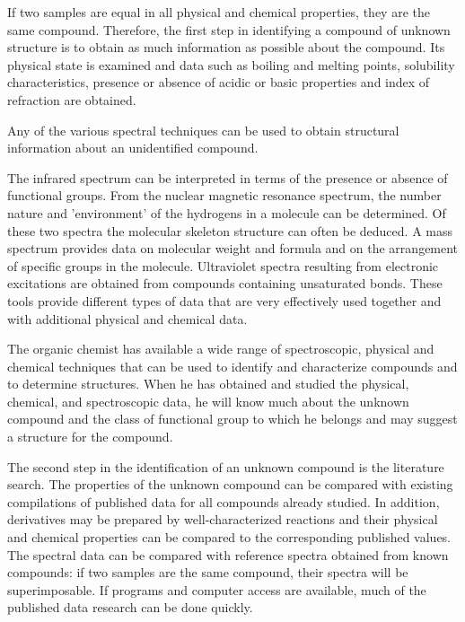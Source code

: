 If two samples are equal in all physical and chemical properties, they are the same compound. Therefore, the first step in identifying a compound of unknown structure is to obtain as much information as possible about the compound. Its physical state is examined and data such as boiling and melting points, solubility characteristics, presence or absence of acidic or basic properties and index of refraction are obtained.

Any of the various spectral techniques can be used to obtain structural information about an unidentified compound.

The infrared spectrum can be interpreted in terms of the presence or absence of functional groups. From the nuclear magnetic resonance spectrum, the number nature and 'environment' of the hydrogens in a molecule can be determined. Of these two spectra the molecular skeleton structure can often be deduced. A mass spectrum provides data on molecular weight and formula and on the arrangement of specific groups in the molecule. Ultraviolet spectra resulting from electronic excitations are obtained from compounds containing unsaturated bonds. These tools provide different types of data that are very effectively used together and with additional physical and chemical data.

The organic chemist has available a wide range of spectroscopic, physical and chemical techniques that can be used to identify and characterize compounds and to determine structures. When he has obtained and studied the physical, chemical, and spectroscopic data, he will know much about the unknown compound and the class of functional group to which he belongs and may suggest a structure for the compound.

The second step in the identification of an unknown compound is the literature search. The properties of the unknown compound can be compared with existing compilations of published data for all compounds already studied. In addition, derivatives may be prepared by well-characterized reactions and their physical and chemical properties can be compared to the corresponding published values. The spectral data can be compared with reference spectra obtained from known compounds: if two samples are the same compound, their spectra will be superimposable. If programs and computer access are available, much of the published data research can be done quickly.


